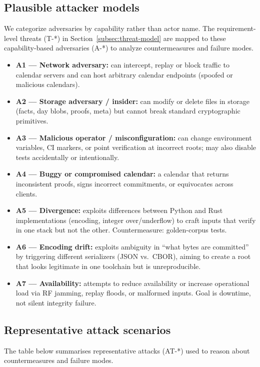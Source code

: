 \subsection{Plausible attacker models}
We categorize adversaries by capability rather than actor name.
The requirement-level threats (T-*) in Section~\ref{subsec:threat-model} are mapped to these capability-based adversaries (A-*) to analyze countermeasures and failure modes.
\begin{itemize}[nosep]
  \item \textbf{A1 — Network adversary:} can intercept, replay or block traffic to calendar servers and can host arbitrary calendar endpoints (spoofed or malicious calendars).
  \item \textbf{A2 — Storage adversary / insider:} can modify or delete files in storage (facts, day blobs, proofs, meta) but cannot break standard cryptographic primitives.
  \item \textbf{A3 — Malicious operator / misconfiguration:} can change environment variables, \ac{CI} markers, or point verification at incorrect roots; may also disable tests accidentally or intentionally.
  \item \textbf{A4 — Buggy or compromised calendar:} a calendar that returns inconsistent proofs, signs incorrect commitments, or equivocates across clients.
  \item \textbf{A5 — Divergence:} exploits differences between Python and Rust implementations (encoding, integer over/underflow) to craft inputs that verify in one stack but not the other.
  Countermeasure: golden-corpus tests.
  \item \textbf{A6 — Encoding drift:} exploits ambiguity in ``what bytes are committed'' by triggering different serializers (\ac{JSON} vs.\ \ac{CBOR}), aiming to create a root that looks legitimate in one toolchain but is unreproducible.
  \item \textbf{A7 — Availability:} attempts to reduce availability or increase operational load via RF jamming, replay floods, or malformed inputs.
  Goal is downtime, not silent integrity failure.
\end{itemize}

\subsection{Representative attack scenarios}
The table below summarises representative attacks (AT-*) used to reason about countermeasures and failure modes.

